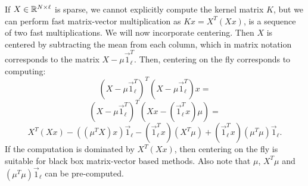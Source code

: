 If $X \in \mathbb{R}^{N \times \ell}$ is sparse, we cannot explicitly compute the kernel matrix
$K$, but we can perform fast matrix-vector multiplication as $K x = X^T(X x)$,
is a sequence of two fast multiplications. We will now incorporate centering.
Then $X$ is centered by subtracting the mean from each column, which in matrix notation corresponds to
the matrix $X - \mu \vec{1}_\ell^T$.
Then, centering on the fly corresponds to computing:
$$(X - \mu \vec{1}_\ell^T)^T (X - \mu \vec{1}_\ell^T) x =$$
$$(X - \mu \vec{1}_\ell^T)^T (X x - (\vec{1}_\ell^T x) \mu ) = $$
$$X^T (X x)  - ((\mu^T X) x) \vec{1}_\ell - (\vec{1}_\ell^T x) (X^T \mu) 
+  (\vec{1}_\ell^T  x)(\mu^T \mu) \vec{1}_\ell .$$
If the computation is dominated by $X^T (X x)$, then centering on the fly is
suitable for black box matrix-vector based methods.
Also note that $\mu$, $X^T\mu$ and $(\mu^T \mu) \vec{1}_\ell$ can be pre-computed.
